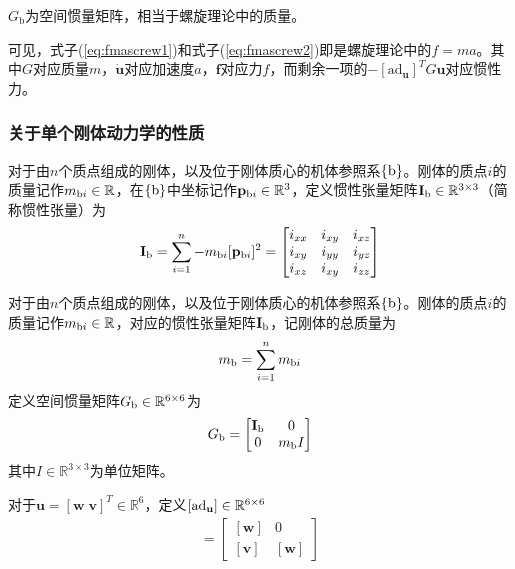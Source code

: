 \documentclass[12pt, a4paper, article, UTF8]{ctexart}
\begin{document}
$G_\text{b}$为空间惯量矩阵，相当于螺旋理论中的质量。

可见，式子(\ref{eq:fmascrew1})和式子(\ref{eq:fmascrew2})即是螺旋理论中的$f=ma$。其中$G$对应质量$m$，$\dot{\mathbf{u}}$对应加速度$a$，$\mathbf{f}$对应力$f$，而剩余一项的$-[\text{ad}_{\mathbf{u}}]^T G\mathbf{u}$对应惯性力。

\subsubsection{关于单个刚体动力学的性质}
\begin{mydefinition}
对于由$n$个质点组成的刚体，以及位于刚体质心的机体参照系$\{\textnormal{b}\}$。刚体的质点$i$的质量记作$m_{\textnormal{b}i}\in\mathbb{R}$，在$\{\textnormal{b}\}$中坐标记作$\mathbf{p}_{\textnormal{b}i} \in\mathbb{R}^3$，定义惯性张量矩阵$\mathbf{I}_\textnormal{b}\in\mathbb{R}^{3\times 3}$（简称惯性张量）为
\begin{align*}
\mathbf{I}_\textnormal{b} = \sum_{i=1}^{n} - m_{\textnormal{b}i} [\mathbf{p}_{\textnormal{b}i}]^2 = \begin{bmatrix}
i_{xx} & i_{xy} & i_{xz}\\
i_{xy} & i_{yy} & i_{yz}\\
i_{xz} & i_{xy} & i_{zz}
\end{bmatrix}
\end{align*}
\end{mydefinition}

\begin{mydefinition}
对于由$n$个质点组成的刚体，以及位于刚体质心的机体参照系$\{\textnormal{b}\}$。刚体的质点$i$的质量记作$m_{\textnormal{b}i}\in\mathbb{R}$，对应的惯性张量矩阵$\mathbf{I}_\textnormal{b}$，记刚体的总质量为
\begin{align*}
m_\textnormal{b}=\sum_{i=1}^{n} m_{\textnormal{b}i}
\end{align*}
定义空间惯量矩阵$G_\textnormal{b}\in\mathbb{R}^{6\times 6}$为
\begin{align*}
G_\textnormal{b} = \begin{bmatrix}
\mathbf{I}_\textnormal{b} & 0\\
0 & m_\textnormal{b}I
\end{bmatrix}
\end{align*}
其中$I\in\mathbb{R}^{3\times 3}$为单位矩阵。
\end{mydefinition}

\begin{mydefinition}
对于$\mathbf{u} = [\mathbf{w}\; \mathbf{v}]^T\in \mathbb{R}^6$，定义$[\textnormal{ad}_{\mathbf{u}}]\in\mathbb{R}^{6\times 6}$
\begin{align*}
[\textnormal{ad}_{\mathbf{u}}] = \begin{bmatrix}
[\mathbf{w}] & 0 \\
[\mathbf{v}] & [\mathbf{w}]
\end{bmatrix}
\end{align*}
\end{mydefinition}
\end{document}
